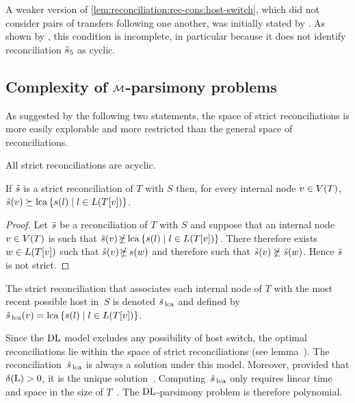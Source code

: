 A weaker version of \cref{lem:reconciliation:rec-cons:host-switch}, which did not consider pairs of transfers following one another, was initially stated by \textcite{Charleston1998JunglesNewSolution}.
As shown by \textcite{Tofigh2009InferringDuplicationsLateral}, this condition is incomplete, in particular because it does not identify reconciliation \(\tilde{s}_5\) as cyclic.

\subsection{Complexity of \(\mathcal{M}\)-parsimony problems}

As suggested by the following two statements, the space of strict reconciliations is more easily explorable and more restricted than the general space of reconciliations.

\begin{remark}
    All strict reconciliations are acyclic.
\end{remark}

\begin{lemma}\label{lemma:strict-rec-space}
    If \(\tilde{s}\) is a strict reconciliation of \(T\) with \(S\) then, for every internal node \(v \in V(T)\),
    \(\tilde{s}(v) \succeq \mathrm{lca}\left\{ s(l) \mid l \in L(T[v]) \right\}\).
\end{lemma}
\vspace{-1em}
\begin{proof}
    Let \(\tilde{s}\) be a reconciliation of \(T\) with \(S\) and suppose that an internal node \(v \in V(T)\) is such that
    \(\rec(v) \nottancs \lca\left\{ \llmap(l) \suchthat l \in \tleavs(\subtree{T}{v}) \right\}\).
    There therefore exists \(w \in L(T[v])\) such that \(\rec(v) \nottancs \llmap(w)\)
    and therefore such that \(\tilde{s}(v) \not\succeq \tilde{s}(w)\).
    Hence \(\tilde{s}\) is not strict.
\end{proof}

\vspace{-.5em}
The strict reconciliation that associates each internal node of \(T\) with the most recent possible host in~\(S\) is denoted \(\tilde{s}_{\,\mathrm{lca}}\) and defined by \(
    \tilde{s}_{\,\mathrm{lca}}(v) = \mathrm{lca}\left\{ s(l) \mid l \in L(T[v]) \right\}
\).

Since the \(\mathrm{D}\mathrm{L}\) model excludes any possibility of host switch, the optimal reconciliations lie within the space of strict reconciliations (see lemma~).
The reconciliation~\(\tilde{s}_{\,\mathrm{lca}}\) is always a solution under this model.
Moreover, provided that \(\delta\kern.1pt(\mathrm{L}) > 0\), it is the unique solution~\parencite{Chauve2009NewPerspectivesGene}.
Computing~\(\tilde{s}_{\,\mathrm{lca}}\) only requires linear time and space in the size of \(T\)~\parencite{Zhang1997MirkinMuchnikSmith}.
The \(\mathrm{D}\mathrm{L}\)-parsimony problem is therefore polynomial.

